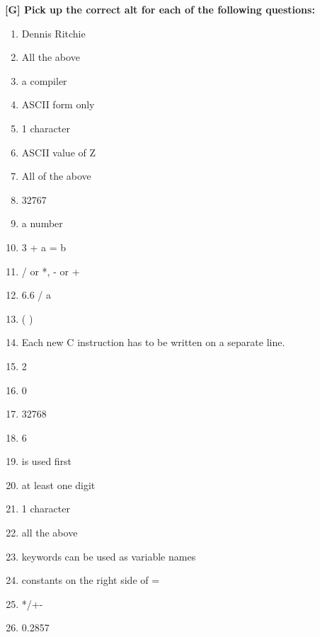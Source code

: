 \documentclass{report}
\begin{document}
\textbf{[G] Pick up the correct alt for each of the following questions:}
\begin{enumerate}
    \renewcommand{\labelenumi}{\alph{enumi}}
  \item Dennis Ritchie
  \item All the above
  \item a compiler
  \item ASCII form only
  \item 1 character
  \item ASCII value of Z
  \item All of the above
  \item 32767
  \item a number
  \item 3 + a = b
  \item / or *, - or +
  \item 6.6 / a
  \item ( )
  \item Each new C instruction has to be written on a separate line.
  \item 2
  \item 0
  \item 32768
  \item 6
  \item is used first
  \item at least one digit
  \item 1 character
  \item all the above
  \item keywords can be used as variable names
  \item constants on the right side of =
  \item */+-
  \item 0.2857
\end{enumerate}
\end{document}
